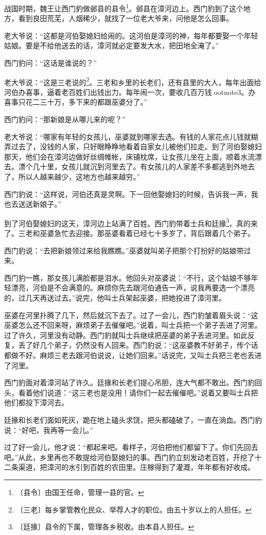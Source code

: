 \documentclass[12pt,UTF-8,openany]{ctexbook}
\begin{document}
\begin{large}
    
    战国时期，魏王让西门豹做邺县的县令\footnote{〔县令〕由国王任命，管理一县的官。}。邺县在漳河边上。西门豹到了这个地方，看到良田荒芜，人烟稀少，就找了一位老大爷来，问他是怎么回事。
    
    老大爷说：“这都是河伯娶媳妇给闹的。这河伯是漳河的神，每年都要娶一个年轻姑娘。要是不给他送去的话，漳河就必定要发大水，把田地全淹了。”
    
    西门豹问：“这话是谁说的？”
    
    老大爷说：“这是三老说的\footnote{〔三老〕每乡掌管教化民众、举荐人才的职位。由五十岁以上的人担任。}。三老和乡里的长老们，还有县里的大人，每年出面给河伯办喜事，逼着老百姓们出钱出力。每年闹一次，要收几百万钱ootnote{3}。办喜事只花二三十万，多下来的都跟巫婆分了。”
    
    西门豹问：“那新娘是从哪儿来的呢？”
    
    老大爷说：“哪家有年轻的女孩儿，巫婆就到哪家去选。有钱的人家花点儿钱就糊弄过去了，没钱的人家，只好眼睁睁地看着自家女儿被他们拉走。到了河伯娶媳妇那天，他们会在漳河边做好丝绸帷帐，床铺枕席，让女孩儿坐在上面，顺着水流漂去。漂个几十里，女孩儿就沉到河里去了。有女孩儿的人家差不多都逃到外地去了，所以人越来越少，这地方也越来越穷。” 
    
    西门豹说：“这样说，河伯还真是灵啊。下一回他娶媳妇的时候，告诉我一声，我也去送送新娘子。”
    
    到了河伯娶媳妇的这天，漳河边上站满了百姓。西门豹带着士兵和廷掾\footnote{〔廷掾〕县令的下属，管理各乡税收。由本县人担任。}，真的来了。三老和巫婆急忙去迎接。那巫婆看着已经七十多岁了，背后跟着几个弟子。
    
    西门豹说：“去把新娘领过来给我瞧瞧。”巫婆就叫弟子把那个打扮好的姑娘带过来。
    
    西门豹一瞧，那女孩儿满脸都是泪水。他回头对巫婆说：“不行，这个姑娘不够年轻漂亮，河伯是不会满意的。麻烦你先去跟河伯通告一声，说我再要选一个漂亮的，过几天再送过去。”说完，他叫士兵架起巫婆，把她投进了漳河里。
    
    巫婆在河里扑腾了几下，然后就沉下去了。过了一会儿，西门豹皱着眉头说：“这巫婆怎么还不回来呀，麻烦弟子去催催吧。”说着，叫士兵把一个弟子丢进了河里。过了许久，河里没有动静。西门豹就叫士兵继续把巫婆的弟子丢进河里。如此反复，丢了好几个弟子，仍然没有人回来。西门豹说：“这巫婆教不好弟子，传个话都做不好。麻烦三老去跟河伯说说，让她们回来。”话说完，又叫士兵把三老也丢进了河里。
    
    西门豹面对着漳河站了许久。廷掾和长老们提心吊胆，连大气都不敢出。西门豹回头，看着他们说道：“这三老也是没用！请你们一起去催催吧。”说着又要叫士兵把他们都投下漳河去。
    
    廷掾和长老们面如死灰，跪在地上磕头求饶，把头都磕破了，一直在淌血。西门豹说：“好吧，我再等一会儿。”
    
    过了好一会儿，他才说：“都起来吧。看样子，河伯把他们都留下了。你们先回去吧。”从此，乡里再也不敢提给河伯娶媳妇的事。西门豹立刻发动老百姓，开挖了十二条渠道，把漳河的水引到百姓的农田里。庄稼得到了灌溉，年年都有好收成。
    
\end{large}
\end{document}
